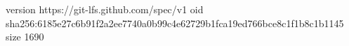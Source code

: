 version https://git-lfs.github.com/spec/v1
oid sha256:6185e27c6b91f2a2ee7740a0b99c4e62729b1fca19ed766bce8c1f1b8c1b1145
size 1690
